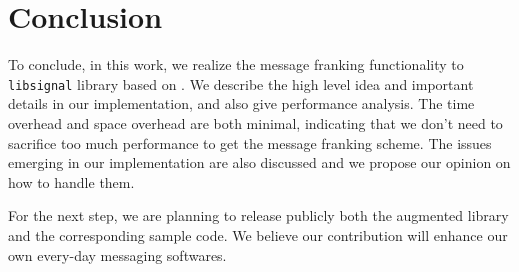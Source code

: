 
\section{Conclusion}
To conclude,
in this work, we realize the message franking functionality to \texttt{libsignal} library
based on \cite{grubbs_message_2017}.
We describe the high level idea and important details in our implementation,
and also give performance analysis. 
The time overhead and space overhead are both minimal, %
indicating that we don't need to sacrifice too much performance to get the message franking scheme.
The issues emerging in our implementation are also discussed and
we propose our opinion on how to handle them.

For the next step,
we are planning to release publicly 
both the augmented library and the corresponding sample code.
We believe our contribution will 
enhance our own every-day messaging softwares.

